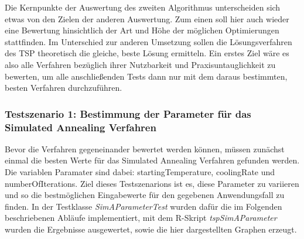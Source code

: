 Die Kernpunkte der Auswertung des zweiten Algorithmus unterscheiden sich etwas von den Zielen der anderen Auswertung. Zum einen soll hier auch wieder eine Bewertung hinsichtlich der Art und Höhe der möglichen Optimierungen stattfinden. Im Unterschied zur anderen Umsetzung sollen die Lösungsverfahren des TSP theoretisch die gleiche, beste Lösung ermitteln. Ein erstes Ziel wäre es also alle Verfahren bezüglich ihrer Nutzbarkeit und Praxisuntauglichkeit zu bewerten, um alle anschließenden Tests dann nur mit dem daraus bestimmten, besten Verfahren durchzuführen.

\subsubsection{Testszenario 1: Bestimmung der Parameter für das Simulated Annealing Verfahren}

Bevor die Verfahren gegeneinander bewertet werden können, müssen zunächst einmal die besten Werte für das Simulated Annealing Verfahren gefunden werden. Die variablen Paramater sind dabei: startingTemperature, coolingRate und numberOfIterations. Ziel dieses Testszenarions ist es, diese Parameter zu variieren und so die bestmöglichen Eingabewerte für den gegebenen Anwendungsfall zu finden. In der Testklasse \textit{SimAParameterTest} wurden dafür die im Folgenden beschriebenen Abläufe implementiert, mit dem R-Skript \textit{tspSimAParameter} wurden die Ergebnisse ausgewertet, sowie die hier dargestellten Graphen erzeugt.


